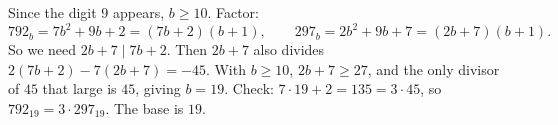 Since the digit $9$ appears, $b\ge10$. Factor:
\[
792_b=7b^2+9b+2=(7b+2)(b+1),\qquad 297_b=2b^2+9b+7=(2b+7)(b+1).
\]
So we need $2b+7\mid7b+2$. Then $2b+7$ also divides $2(7b+2)-7(2b+7)=-45$. With $b\ge10$, $2b+7\ge27$, and the only divisor of $45$ that large is $45$, giving $b=19$. Check: $7\cdot19+2=135=3\cdot45$, so $792_{19}=3\cdot297_{19}$. The base is $\boxed{19}$.
